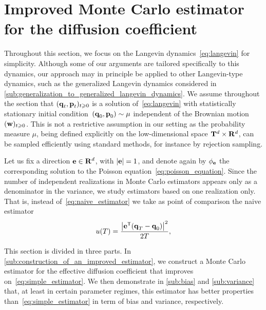 \documentclass[11pt,a4paper]{article}
\begin{document}
\section{Improved Monte Carlo estimator for the diffusion coefficient}%
\label{sec:method}%

Throughout this section,
we focus on the Langevin dynamics~\eqref{eq:langevin} for simplicity.
Although some of our arguments are tailored specifically to this dynamics,
our approach may in principle be applied to other Langevin-type dynamics,
such as the generalized Langevin dynamics considered in \cref{sub:generalization_to_generalized_langevin_dynamics}.
We assume throughout the section that $(\boldsymbol{\mathbf q}_t, \boldsymbol{\mathbf p}_t)_{t\geqslant 0}$ is a solution of~\eqref{eq:langevin} with statistically stationary initial condition~$(\boldsymbol{\mathbf q}_0, \boldsymbol{\mathbf p}_0) \sim \mu$ independent of the Brownian motion $(\boldsymbol{\mathbf w})_{t \geqslant 0}$.
This is not a restrictive assumption in our setting as the probability measure $\mu$,
being defined explicitly on the low-dimensional space $\mathbf T^d \times \mathbf R^d$,
can be sampled efficiently using standard methods,
for instance by rejection sampling.

Let us fix a direction $\boldsymbol{\mathbf e} \in \mathbf R^d$, with $|\boldsymbol{\mathbf e}| = 1$,
and denote again by $\phi_{\boldsymbol{\mathbf e}}$ the corresponding solution to the Poisson equation~\eqref{eq:poisson_equation}.
Since the number of independent realizations in Monte Carlo estimators
appears only as a denominator in the variance,
we study estimators based on one realization only.
That is, instead of~\eqref{eq:naive_estimator} we take as point of comparison the naive estimator
\begin{equation}
    \label{eq:simple_estimator}
    u(T) = \frac{\abs{\vect e^\t (\vect q_T - \vect q_0)}^2}{2T},
\end{equation}

This section is divided in three parts.
In \cref{sub:construction_of_an_improved_estimator},
we construct a Monte Carlo estimator for the effective diffusion coefficient that improves on~\eqref{eq:simple_estimator}.
We then demonstrate in \cref{sub:bias} and \cref{sub:variance} that,
at least in certain parameter regimes,
this estimator has better properties than~\eqref{eq:simple_estimator} in term of bias and variance, respectively.
\end{document}
